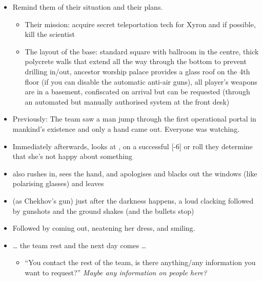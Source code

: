 \begin{itemize}
\item Remind them of their situation and their plans.
  \begin{itemize}
  \item Their mission: acquire secret teleportation tech for Xyron and if
    possible, kill the scientist
  \item The layout of the base: standard square with ballroom in the centre,
    thick polycrete walls that extend all the way through the bottom to prevent
    drilling in/out, ancestor worship palace provides a glass roof on the 4th
    floor (if you can disable the automatic anti-air guns), all player's weapons
    are in a basement, confiscated on arrival but can be requested (through an
    automated but manually authorised system at the front desk)
  \end{itemize}
\item Previously: The team saw a man jump through the first operational portal
  in mankind's existence and only a hand came out. Everyone was watching.
\item Immediately afterwards,  looks at , on a
  successful [-6] or  roll they
  determine that she's not happy about something
\item {} also rushes in, sees the hand, and apologises and blacks out
  the windows (like polarising glasses) and  leaves
\item (as Chekhov's gun) just after the darkness happens, a loud clacking
  followed by gunshots and the ground shakes (and the bullets stop)
\item Followed by  coming out, neatening her dress, and smiling.
\item \ldots{} the team rest and the next day comes \ldots{}
  \begin{itemize}
  \item ``You contact the rest of the team, is there anything/any information
    you want to request?'' \emph{Maybe any information on people here?}
  \end{itemize}
  

\end{itemize}
